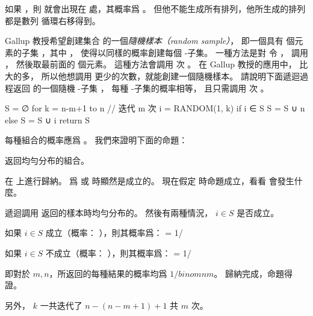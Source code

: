 \startANSWER
如果 ，則  就會出現在  處，其概率爲 。
但他不能生成所有排列，他所生成的排列都是數列  循環右移得到。
\stopANSWER

\startEXERCISE
Gallup 教授希望創建集合  的一個\emph{隨機樣本（random sample）}，
即一個具有  個元素的子集 ，其中 ，
使得以同樣的概率創建每個 -子集。
一種方法是對  令 ，
調用 ，
然後取最前面的  個元素。
這種方法會調用  次 。
在 Gallup 教授的應用中，  比  大的多，
所以他想調用  更少的次數，就能創建一個隨機樣本。
請說明下面遞迴過程返回  的一個隨機 -子集 ，
每種 -子集的概率相等，
且只需調用  次 。

\startCLRSCODE
S = ∅
for k = n-m+1 to n	// 迭代 m 次
	i = RANDOM(1, k)
	if i ∈ S
		S = S ∪ {n}
	else S = S ∪ {i}
	return S
\stopCLRSCODE
\stopEXERCISE

\startANSWER
每種組合的概率應爲 。
我們來證明下面的命題：

 返回均勻分布的組合。

在  上進行歸納。  爲  或  時顯然是成立的。
現在假定  時命題成立，看看  會發生什麼。

遞迴調用  返回的樣本時均勻分布的。
然後有兩種情況， $i ∈ S$ 是否成立。

如果 $i ∈ S$ 成立（概率： ），則其概率爲：
\startformula
{} = 1/
\stopformula

如果 $i ∈ S$ 不成立（概率： ），則其概率爲：
\startformula
{} = 1/
\stopformula

即對於 $m,n$，所返回的每種結果的概率均爲 $1/binom{n}{m}$。
歸納完成，命題得證。

另外， $k$ 一共迭代了 $n-(n-m+1) + 1$ 共 $m$ 次。
\stopANSWER

\stopsection
